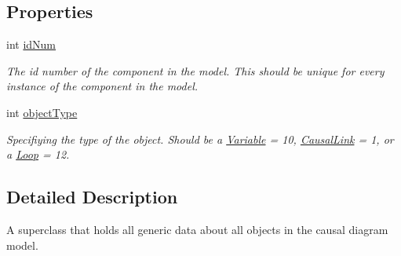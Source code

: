 \subsection*{Properties}
\begin{DoxyCompactItemize}
\item 
\hypertarget{interface_component_aa1014a20b8eef81a91c90ed7740d4a10}{int \hyperlink{interface_component_aa1014a20b8eef81a91c90ed7740d4a10}{id\-Num}}\label{interface_component_aa1014a20b8eef81a91c90ed7740d4a10}

\begin{DoxyCompactList}\small\item\em The id number of the component in the model. This should be unique for every instance of the component in the model. \end{DoxyCompactList}\item 
\hypertarget{interface_component_ab15484f6d515849f3363dd48a9aea09a}{int \hyperlink{interface_component_ab15484f6d515849f3363dd48a9aea09a}{object\-Type}}\label{interface_component_ab15484f6d515849f3363dd48a9aea09a}

\begin{DoxyCompactList}\small\item\em Specifiying the type of the object. Should be a \hyperlink{interface_variable}{Variable} = 10, \hyperlink{interface_causal_link}{Causal\-Link} = 1, or a \hyperlink{interface_loop}{Loop} = 12. \end{DoxyCompactList}\end{DoxyCompactItemize}


\subsection{Detailed Description}
A superclass that holds all generic data about all objects in the causal diagram model. 

